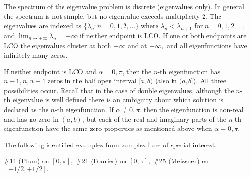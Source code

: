 \documentclass[12pt]{amsart}%
\theoremstyle{plain}
\numberwithin{equation}{section}
\numberwithin{theorem}{section}
\begin{document}
The spectrum of the eigenvalue problem is discrete (eigenvalues only). In
general the spectrum is not simple, but no eigenvalue exceeds multiplicity
$2$. The eigenvalues are indexed as $\{\lambda_{n}:n=0,1,2,...\}$ where
$\lambda_{n}<\lambda_{n+1}$ for $n=0,1,2,...,$and $\lim_{n\rightarrow+\infty
}\lambda_{n}=+\infty$ if neither endpoint is LCO. If one or both endpoints are
LCO the eigenvalues cluster at both $-\infty$ and at $+\infty,$ and all
eigenfunctions have infinitely many zeros.

If neither endpoint is LCO and $\alpha=0,\pi$, then the $n$-th eigenfunction
has $n-1,n,n+1$ zeros in the half open interval $[a,b)$ (also in $(a,b]$). All
three possibilities occur. Recall that in the case of double eigenvalues,
although the $n$-th eigenvalue is well defined there is an ambiguity about
which solution is declared as the $n$-th eigenfunction. If $\alpha\neq0,\pi$,
then the eigenfunction is non-real and has no zero in $(a,b)$, but each of the
real and imaginary parts of the $n$-th eigenfunction have the same zero
properties as mentioned above when $\alpha=0,\pi.$

The following identified examples from xamples.f are of special interest:

\#11 (Plum) on $[0,\pi],$ \#21 (Fourier) on $[0,\pi],$ \#25 (Meissner) on $[-1/2,+1/2].$
\end{document}
